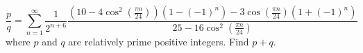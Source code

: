 $$\frac{p}{q} = \sum_{n = 1}^\infty \frac{1}{2^{n + 6}} \frac{(10 - 4\cos^2(\frac{\pi n}{24})) (1 - (-1)^n) - 3\cos(\frac{\pi n}{24}) (1 + (-1)^n)}{25 - 16\cos^2(\frac{\pi n}{24})}$$where $p$ and $q$ are relatively prime positive integers. Find $p + q$.
